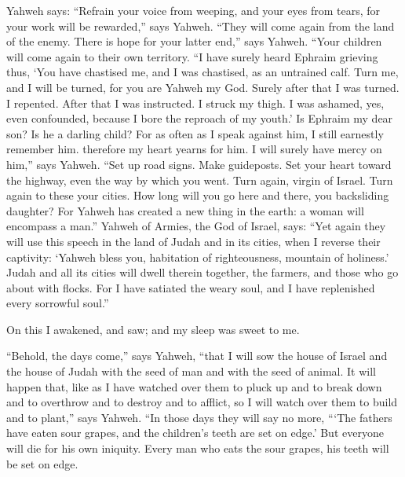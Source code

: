 Yahweh says: ``Refrain your voice from weeping, and your
eyes from tears, for your work will be rewarded,'' says Yahweh. ``They
will come again from the land of the enemy.  There is
hope for your latter end,'' says Yahweh. ``Your children will come again
to their own territory.  ``I have surely heard Ephraim
grieving thus, `You have chastised me, and I was chastised, as an
untrained calf. Turn me, and I will be turned, for you are Yahweh my
God.  Surely after that I was turned. I repented. After
that I was instructed. I struck my thigh. I was ashamed, yes, even
confounded, because I bore the reproach of my youth.'  Is
Ephraim my dear son? Is he a darling child? For as often as I speak
against him, I still earnestly remember him. therefore my heart yearns
for him. I will surely have mercy on him,'' says Yahweh. 
``Set up road signs. Make guideposts. Set your heart toward the highway,
even the way by which you went. Turn again, virgin of Israel. Turn again
to these your cities.  How long will you go here and
there, you backsliding daughter? For Yahweh has created a new thing in
the earth: a woman will encompass a man.''  Yahweh of
Armies, the God of Israel, says: ``Yet again they will use this speech
in the land of Judah and in its cities, when I reverse their captivity:
`Yahweh bless you, habitation of righteousness, mountain of holiness.'
 Judah and all its cities will dwell therein together,
the farmers, and those who go about with flocks.  For I
have satiated the weary soul, and I have replenished every sorrowful
soul.''

 On this I awakened, and saw; and my sleep was sweet to
me.

 ``Behold, the days come,'' says Yahweh, ``that I will
sow the house of Israel and the house of Judah with the seed of man and
with the seed of animal.  It will happen that, like as I
have watched over them to pluck up and to break down and to overthrow
and to destroy and to afflict, so I will watch over them to build and to
plant,'' says Yahweh.  ``In those days they will say no
more, ```The fathers have eaten sour grapes, and the children's teeth
are set on edge.'  But everyone will die for his own
iniquity. Every man who eats the sour grapes, his teeth will be set on
edge.

